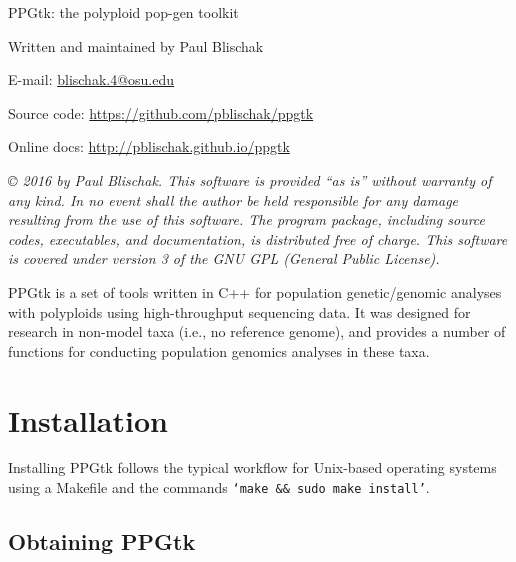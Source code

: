 \documentclass[11pt,english,letterpaper,oneside]{article}
\newcommand{\ppgtk}{PPGtk}
\begin{document}
\pagestyle{empty}

\vspace*{1.5in}
\begin{center}

	{\huge \ppgtk: the polyploid pop-gen toolkit}
	\vspace{0.5in}

	Written and maintained by Paul Blischak

	E-mail: \href{mailto:blischak.4@osu.edu}{blischak.4@osu.edu}

	Source code: \url{https://github.com/pblischak/ppgtk}

	Online docs: \url{http://pblischak.github.io/ppgtk}

\end{center}

\vspace{4in}

{\small \textit{\copyright{} 2016 by Paul Blischak. This software is provided ``as is'' without warranty of any kind. In no event shall the author be held responsible for any damage resulting from the use of this software. The program package, including source codes, executables, and documentation, is distributed free of charge. This software is covered under version 3 of the GNU GPL (General Public License).}}

\newpage

\tableofcontents

\newpage

\clearpage
\pagestyle{plain}
\setcounter{page}{1}

\ppgtk{} is a set of tools written in C++ for population genetic/genomic analyses with polyploids using high-throughput sequencing data. It was designed for research in non-model taxa (i.e., no reference genome), and provides a number of functions for conducting population genomics analyses in these taxa.

\section{Installation}

Installing \ppgtk{} follows the typical workflow for Unix-based operating systems using a Makefile and the commands \texttt{`make \&\& sudo make install'}.

\subsection{Obtaining \ppgtk}
\end{document}
